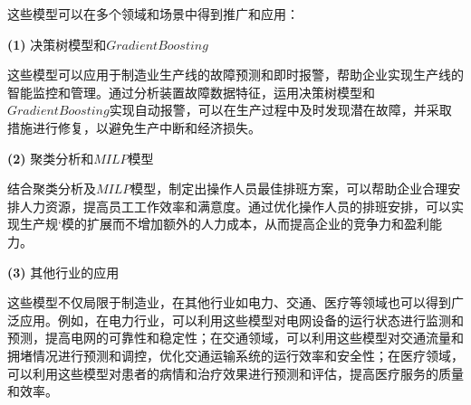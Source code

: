 \documentclass[withoutpreface,bwprint]{cumcmthesis}
\begin{document}
这些模型可以在多个领域和场景中得到推广和应用：

\textbf{(1)} 决策树模型和\(Gradient Boosting\)

这些模型可以应用于制造业生产线的故障预测和即时报警，帮助企业实现生产线的智能监控和管理。通过分析装置故障数据特征，运用决策树模型和\(Gradient Boosting\)实现自动报警，可以在生产过程中及时发现潜在故障，并采取措施进行修复，以避免生产中断和经济损失。

\textbf{(2)} 聚类分析和\(MILP\)模型

结合聚类分析及\(MILP\)模型，制定出操作人员最佳排班方案，可以帮助企业合理安排人力资源，提高员工工作效率和满意度。通过优化操作人员的排班安排，可以实现生产规`模的扩展而不增加额外的人力成本，从而提高企业的竞争力和盈利能力。

\textbf{(3)} 其他行业的应用

这些模型不仅局限于制造业，在其他行业如电力、交通、医疗等领域也可以得到广泛应用。例如，在电力行业，可以利用这些模型对电网设备的运行状态进行监测和预测，提高电网的可靠性和稳定性；在交通领域，可以利用这些模型对交通流量和拥堵情况进行预测和调控，优化交通运输系统的运行效率和安全性；在医疗领域，可以利用这些模型对患者的病情和治疗效果进行预测和评估，提高医疗服务的质量和效率。

\newpage

\nocite{*}


%

%
\end{document}
